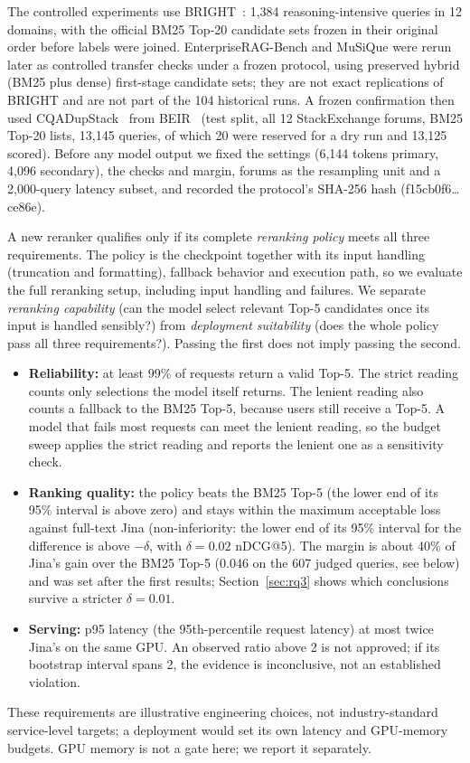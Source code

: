\documentclass[conference]{IEEEtran}
\begin{document}
{The controlled experiments use BRIGHT~\cite{su2025bright}: 1,384 reasoning-intensive queries in 12 domains, with the official BM25 Top-20 candidate sets frozen in their original order before labels were joined. EnterpriseRAG-Bench and MuSiQue were rerun later as controlled transfer checks under a frozen protocol, using preserved hybrid (BM25 plus dense) first-stage candidate sets; they are not exact replications of BRIGHT and are not part of the 104 historical runs. A frozen confirmation then used CQADupStack~\cite{hoogeveen2015cqadupstack} from BEIR~\cite{thakur2021beir} (test split, all 12 StackExchange forums, BM25 Top-20 lists, 13,145 queries, of which 20 were reserved for a dry run and 13,125 scored). Before any model output we fixed the settings (6,144 tokens primary, 4,096 secondary), the checks and margin, forums as the resampling unit and a 2,000-query latency subset, and recorded the protocol's SHA-256 hash (f15cb0f6\ldots ce86e).

A new reranker qualifies only if its complete \emph{reranking policy} meets all three requirements. The policy is the checkpoint together with its input handling (truncation and formatting), fallback behavior and execution path, so we evaluate the full reranking setup, including input handling and failures. We separate \emph{reranking capability} (can the model select relevant Top-5 candidates once its input is handled sensibly?) from \emph{deployment suitability} (does the whole policy pass all three requirements?). Passing the first does not imply passing the second.
\begin{itemize}
\item \textbf{Reliability:} at least 99\% of requests return a valid Top-5. The strict reading counts only selections the model itself returns. The lenient reading also counts a fallback to the BM25 Top-5, because users still receive a Top-5. A model that fails most requests can meet the lenient reading, so the budget sweep applies the strict reading and reports the lenient one as a sensitivity check.
\item \textbf{Ranking quality:} the policy beats the BM25 Top-5 (the lower end of its 95\% interval is above zero) and stays within the maximum acceptable loss against full-text Jina (non-inferiority: the lower end of its 95\% interval for the difference is above $-\delta$, with $\delta=0.02$ nDCG@5). The margin is about 40\% of Jina's gain over the BM25 Top-5 (0.046 on the 607 judged queries, see below) and was set after the first results; Section~\ref{sec:rq3} shows which conclusions survive a stricter $\delta=0.01$.
\item \textbf{Serving:} p95 latency (the 95th-percentile request latency) at most twice Jina's on the same GPU. An observed ratio above 2 is not approved; if its bootstrap interval spans 2, the evidence is inconclusive, not an established violation.
\end{itemize}
These requirements are illustrative engineering choices, not industry-standard service-level targets; a deployment would set its own latency and GPU-memory budgets. GPU memory is not a gate here; we report it separately.

}
\end{document}
